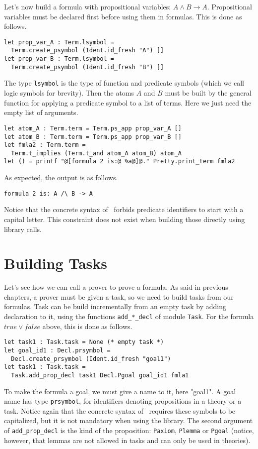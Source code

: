 Let's now build a formula with propositional variables: $A \land B
\rightarrow A$. Propositional variables must be declared first before
using them in formulas. This is done as follows.
\begin{verbatim}
let prop_var_A : Term.lsymbol =
  Term.create_psymbol (Ident.id_fresh "A") []
let prop_var_B : Term.lsymbol =
  Term.create_psymbol (Ident.id_fresh "B") []
\end{verbatim}
The type \texttt{lsymbol} is the type of function and predicate symbols (which
we call logic symbols for brevity). Then the atoms $A$ and $B$ must be built
by the general function for applying a predicate symbol to a list of terms.
Here we just need the empty list of arguments.
\begin{verbatim}
let atom_A : Term.term = Term.ps_app prop_var_A []
let atom_B : Term.term = Term.ps_app prop_var_B []
let fmla2 : Term.term =
  Term.t_implies (Term.t_and atom_A atom_B) atom_A
let () = printf "@[formula 2 is:@ %a@]@." Pretty.print_term fmla2
\end{verbatim}

As expected, the output is as follows.
\begin{verbatim}
formula 2 is: A /\ B -> A
\end{verbatim}
Notice that the concrete syntax of \why\ forbids predicate identifiers
to start with a capital letter. This constraint does not exist when
building those directly using library calls.

\section{Building Tasks}

Let's see how we can call a prover to prove a formula. As said in
previous chapters, a prover must be given a task, so we need to build
tasks from our formulas. Task can be build incrementally from an empty
task by adding declaration to it, using the functions
\texttt{add\_*\_decl} of module \texttt{Task}. For the formula $true \lor
false$ above, this is done as follows.
\begin{verbatim}
let task1 : Task.task = None (* empty task *)
let goal_id1 : Decl.prsymbol =
  Decl.create_prsymbol (Ident.id_fresh "goal1")
let task1 : Task.task =
  Task.add_prop_decl task1 Decl.Pgoal goal_id1 fmla1
\end{verbatim}
To make the formula a goal, we must give a name to it, here "goal1". A
goal name has type \texttt{prsymbol}, for identifiers denoting
propositions in a theory or a task. Notice again that the concrete
syntax of \why\ requires these symbols to be capitalized, but it is not
mandatory when using the library. The second argument of
\texttt{add\_prop\_decl} is the kind of the proposition:
\texttt{Paxiom}, \texttt{Plemma} or \texttt{Pgoal}
(notice, however, that lemmas are not allowed in tasks
and can only be used in theories).


